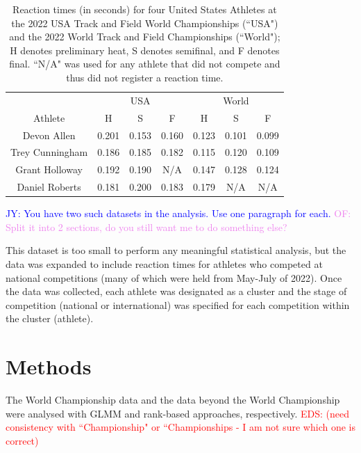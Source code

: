 \documentclass[12pt, letterpaper, titlepage]{article}
\newcommand{\jy}[1]{\textcolor{blue}{JY: #1}}
\newcommand{\eds}[1]{\textcolor{red}{EDS: (#1)}}
\newcommand{\of}[1]{\textcolor{violet}{OF: #1}}
\begin{document}
\begin{table}
\begin{center}
  \caption{Reaction times (in seconds) for four United States Athletes at the 
	2022 USA Track
  and Field World Championships (``USA") and the 2022 World Track and Field 
	Championships (``World"); H denotes preliminary heat, S denotes semifinal, and 
	F denotes final.
  ``N/A" was used for any athlete that did not compete and thus did not register 
  a reaction time. }
  \begin{tabular}{c c c c c c c} 
   \toprule
	 & \multicolumn{3}{c}{USA} & \multicolumn{3}{c}{World} \\
	\cmidrule(lr){2-4}
    \cmidrule(lr){5-7}
   Athlete &  H &  S &  F &  H &  S &  F \\ [0.5ex] 
   \midrule
   Devon Allen & 0.201 & 0.153 & 0.160 & 0.123 & 0.101 & 0.099 \\ 
   Trey Cunningham & 0.186 & 0.185 & 0.182 & 0.115 & 0.120 & 0.109 \\
   Grant Holloway & 0.192 & 0.190 & N/A & 0.147 & 0.128 & 0.124 \\
   Daniel Roberts & 0.181 & 0.200 & 0.183 & 0.179 & N/A & N/A \\ [0.5ex]
   \bottomrule
  \end{tabular}
  \label{fig:USAvsWorld}
  
  \end{center}
\end{table}

\jy{You have two such datasets in the analysis. Use one paragraph for each.}
\of{Split it into 2 sections, do you still want me to do something else?}


This dataset is too small to perform any meaningful statistical analysis, but
the data was expanded to include reaction times for athletes who competed at 
national competitions (many of which were held from May-July of 2022). Once the 
data was collected, each athlete was designated as a cluster and the stage of
competition (national or international) was specified for each competition 
within the cluster (athlete).  


\section{Methods} \label{sec:Methods}

The World Championship data and the data beyond the World Championship were
analysed with GLMM and rank-based approaches, respectively.
\eds{need consistency with ``Championship" or ``Championships - I am not sure 
which one is correct}
\end{document}
